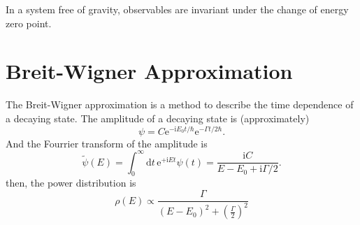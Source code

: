 In a system free of gravity, observables are invariant under the change of energy zero point.

\section{Breit-Wigner Approximation}
The Breit-Wigner approximation is a method to describe the time dependence of a decaying state. The amplitude of a decaying state is (approximately) 
\begin{equation}
  \psi = C \mathrm{e}^{- \mathrm{i} E_0 t / \hbar} \mathrm{e}^{- \Gamma t / 2 \hbar}.
\end{equation}
And the Fourrier transform of the amplitude is
\begin{equation}
  \tilde{\psi} \left( E \right) = \int_{0}^{\infty} \mathrm{d}t \,  \mathrm{e}^{+ \mathrm{i}  Et} \psi\left( t \right) = \frac{\mathrm{i} C}{E - E_0 + \mathrm{i} \Gamma / 2}.
\end{equation}
then, the power distribution is
\begin{equation}
  \rho \left( E \right) \propto \frac{\Gamma}{\left( E - E_0 \right) ^{2} + \left( \frac{\Gamma}{2} \right) ^{2}}
\end{equation}